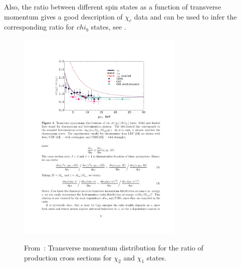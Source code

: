 Also, the ratio between different spin states as a function of transverse
momentum gives a good description of $\chi_c$ data and can be used to infer the
corresponding ratio for $chi_b$ states, see .

\begin{figure}
\center
\includegraphics[width=300px]{figs/review/chibprod_fig4.pdf}
\label{chibprod_fig4} 
\caption{From~\cite{chibprod}: Transverse momentum distribution for the ratio of 
production cross sections for $\chi_2$ and $\chi_1$ states.}
\end{figure} 
